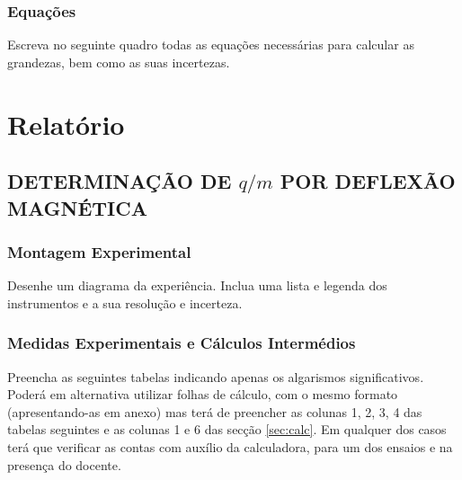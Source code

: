 \documentclass[a4paper,12pt]{article}  %
\begin{document}
\subsubsection{\sf Equações }
Escreva no seguinte quadro todas as equações necessárias para calcular as grandezas, bem como as suas incertezas.
\begin{center}
\framebox[13cm]{\rule{0pt}{6.5cm}}
\end{center}


\section{\sf Relatório}
\subsection{\sf DETERMINAÇÃO DE $q/m$ POR  DEFLEXÃO MAGNÉTICA}
\subsubsection{\sf Montagem Experimental}
Desenhe um diagrama da experiência. Inclua uma lista e legenda dos instrumentos e a sua resolução e incerteza.
\begin{center}
\framebox[18cm]{\rule{0pt}{10cm}}
\end{center}





\subsubsection{\sf Medidas Experimentais e Cálculos Intermédios } \label{sec:dados}
Preencha as seguintes tabelas indicando  apenas os algarismos significativos. Poderá em alternativa utilizar folhas de cálculo, com o mesmo formato (apresentando-as em anexo) mas terá de preencher as colunas 1, 2, 3, 4 das tabelas seguintes e as colunas 1 e 6 das secção \ref{sec:calc}. Em qualquer dos casos terá que verificar as contas com auxílio da calculadora, para um dos ensaios e na presença do docente.

\newpage
\end{document}
